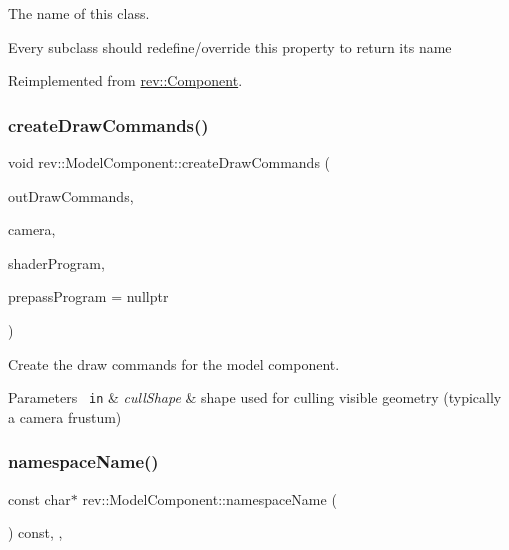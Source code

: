 The name of this class. 

Every subclass should redefine/override this property to return its name 

Reimplemented from \mbox{\hyperlink{classrev_1_1_component_a07619152d5acafe7a536df3a6a476349}{rev\+::\+Component}}.

\mbox{\label{classrev_1_1_model_component_a1c38827ab73085f914690da1334431c4}} 
\subsubsection{\texorpdfstring{createDrawCommands()}{createDrawCommands()}}
{\footnotesize\ttfamily void rev\+::\+Model\+Component\+::create\+Draw\+Commands (\begin{DoxyParamCaption}\item[{std\+::vector$<$ std\+::shared\+\_\+ptr$<$ \mbox{\hyperlink{classrev_1_1_draw_command}{Draw\+Command}} $>$$>$ \&}]{out\+Draw\+Commands,  }\item[{\mbox{\hyperlink{classrev_1_1_abstract_camera}{Abstract\+Camera}} \&}]{camera,  }\item[{\mbox{\hyperlink{classrev_1_1_shader_program}{Shader\+Program}} \&}]{shader\+Program,  }\item[{\mbox{\hyperlink{classrev_1_1_shader_program}{Shader\+Program}} $\ast$}]{prepass\+Program = {\ttfamily nullptr} }\end{DoxyParamCaption})}



Create the draw commands for the model component. 


\begin{DoxyParams}[1]{Parameters}
\mbox{\texttt{ in}}  & {\em cull\+Shape} & shape used for culling visible geometry (typically a camera frustum) \\
\hline
\end{DoxyParams}
\mbox{\label{classrev_1_1_model_component_ad55fe767e54742f08b338f0f13498cf8}} 
\subsubsection{\texorpdfstring{namespaceName()}{namespaceName()}}
{\footnotesize\ttfamily const char$\ast$ rev\+::\+Model\+Component\+::namespace\+Name (\begin{DoxyParamCaption}{ }\end{DoxyParamCaption}) const\hspace{0.3cm}{\ttfamily [inline]}, {\ttfamily [override]}, {\ttfamily [virtual]}}



